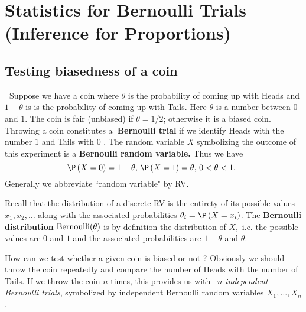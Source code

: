 \section{Statistics for Bernoulli Trials (Inference for Proportions)}\label{S:InfForProps}

\subsection{ Testing biasedness of a coin}

\textbf{\ }Suppose we have a coin where $\theta$ is the probability of coming up
with Heads and $1-\theta$ is is the probability of coming up with Tails. Here $\theta$
is a number between $0$ and $1.$ The coin is fair (unbiased) if $\theta=1/2$;
otherwise it is a biased coin. Throwing a coin constitutes a\textbf{\
Bernoulli trial} if we identify Heads with the number $1$ and Tails with $0$%
. The random variable $X$ symbolizing the outcome of this experiment is a 
\textbf{Bernoulli random variable.} Thus we have 
\begin{equation*}
\P \left( X=0\right) =1-\theta\text{, }\P \left( X=1\right) =\theta\text{, }0<\theta<1%
\text{. }
\end{equation*}%
Generally we abbreviate ``random variable" by RV.

Recall that the distribution of a discrete RV is the entirety of its
possible values $x_{1},x_{2},\ldots $ along with the associated
probabilities $\theta_{i}=\P \left( X=x_{i}\right) $. The \textbf{Bernoulli
distribution} $\mbox{{\rm Bernoulli}}(\theta)$ is by definition the distribution of $X,$
i.e. the possible values are $0$ and $1$ and the associated probabilities
are $1-\theta$ and $\theta$.

How can we test whether a given coin is biased or not ? Obviously we should
throw the coin repeatedly and compare the number of Heads with the number of
Tails. If we throw the coin $n$ times, this provides us with \ $n$ \textit{%
independent Bernoulli trials}, symbolized by independent Bernoulli random
variables $X_{1},\ldots ,X_{n}$. \bigskip \bigskip

